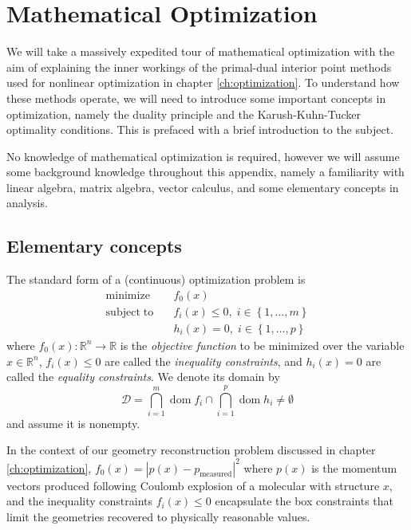 
\chapter{Mathematical Optimization}\label{appx:optimization}
We will take a massively expedited tour of mathematical optimization with the aim of explaining the inner workings of the primal-dual interior point methods used for nonlinear optimization in chapter \ref{ch:optimization}. To understand how these methods operate, we will need to introduce some important concepts in optimization, namely the duality principle and the Karush-Kuhn-Tucker optimality conditions. This is prefaced with a brief introduction to the subject.

No knowledge of mathematical optimization is required, however we will assume some background knowledge throughout this appendix, namely a familiarity with linear algebra, matrix algebra, vector calculus, and some elementary concepts in analysis.

\section{Elementary concepts}
The standard form of a (continuous) optimization problem is
\begin{align} \label{eq:op}
  \mathrm{minimize}   \quad & f_0(x) \nonumber \\
  \mathrm{subject\;to} \quad &
    f_i(x) \leq 0, \; i \in \left\{1, \dots, m \right\}\\
    & h_i(x) = 0, \; i \in \left\{1, \dots, p \right\} \nonumber
\end{align}
where $f_0(x): \mathbb{R}^n \rightarrow \mathbb{R}$ is the \emph{objective function} to be minimized over the variable $x \in \mathbb{R}^n$, $f_i(x) \leq 0$ are called the \emph{inequality constraints}, and $h_i(x) = 0$ are called the \emph{equality constraints}. We denote its domain by
\begin{equation}
\mathcal{D} = \bigcap_{i=1}^m \operatorname{dom} f_i \cap \bigcap_{i=1}^p \operatorname{dom} h_i \neq \emptyset
\end{equation}
and assume it is nonempty.

In the context of our geometry reconstruction problem discussed in chapter \ref{ch:optimization}, $f_0(x) = |p(x)-p_\textrm{measured}|^2$ where $p(x)$ is the momentum vectors produced following Coulomb explosion of a molecular with structure $x$, and the inequality constraints $f_i(x) \leq 0$ encapsulate the box constraints that limit the geometries recovered to physically reasonable values.

